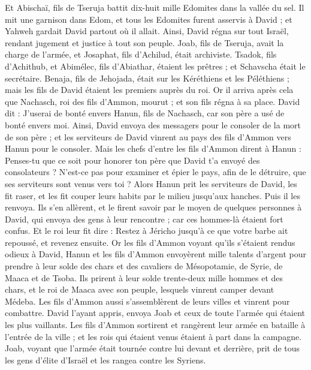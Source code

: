\begin{multicols}{2}
Et Abischaï, fils de Tseruja battit dix-huit mille Edomites dans la vallée du sel.
Il mit une garnison dans Edom, et tous les Edomites furent asservis à David ; et Yahweh gardait David partout où il allait.
Ainsi, David régna sur tout Israël, rendant jugement et justice à tout son peuple.
Joab, fils de Tseruja, avait la charge de l'armée, et Josaphat, fils d'Achilud, était archiviste.
Tsadok, fils d'Achithub, et Abimélec, fils d'Abiathar, étaient les prêtres ; et Schavscha était le secrétaire.
Benaja, fils de Jehojada, était sur les Kéréthiens et les Péléthiens ; mais les fils de David étaient les premiers auprès du roi.
\VerseOne{}Or il arriva après cela que Nachasch, roi des fils d'Ammon, mourut ; et son fils régna à sa place.
David dit : J'userai de bonté envers Hanun, fils de Nachasch, car son père a usé de bonté envers moi. Ainsi, David envoya des messagers pour le consoler de la mort de son père ; et les serviteurs de David vinrent au pays des fils d'Ammon vers Hanun pour le consoler.
Mais les chefs d'entre les fils d'Ammon dirent à Hanun : Penses-tu que ce soit pour honorer ton père que David t'a envoyé des consolateurs ? N'est-ce pas pour examiner et épier le pays, afin de le détruire, que ses serviteurs sont venus vers toi ?
Alors Hanun prit les serviteurs de David, les fit raser, et les fit couper leurs habits par le milieu jusqu'aux hanches. Puis il les renvoya.
Ils s'en allèrent, et le firent savoir par le moyen de quelques personnes à David, qui envoya des gens à leur rencontre ; car ces hommes-là étaient fort confus. Et le roi leur fit dire : Restez à Jéricho jusqu'à ce que votre barbe ait repoussé, et revenez ensuite.
Or les fils d'Ammon voyant qu'ils s'étaient rendus odieux à David, Hanun et les fils d'Ammon envoyèrent mille talents d'argent pour prendre à leur solde des chars et des cavaliers de Mésopotamie, de Syrie, de Maaca et de Tsoba.
Ils prirent à leur solde trente-deux mille hommes et des chars, et le roi de Maaca avec son peuple, lesquels vinrent camper devant Médeba. Les fils d'Ammon aussi s'assemblèrent de leurs villes et vinrent pour combattre.
David l'ayant appris, envoya Joab et ceux de toute l'armée qui étaient les plus vaillants.
Les fils d'Ammon sortirent et rangèrent leur armée en bataille à l'entrée de la ville ; et les rois qui étaient venus étaient à part dans la campagne.
Joab, voyant que l'armée était tournée contre lui devant et derrière, prit de tous les gens d'élite d'Israël et les rangea contre les Syriens.

\end{multicols}

